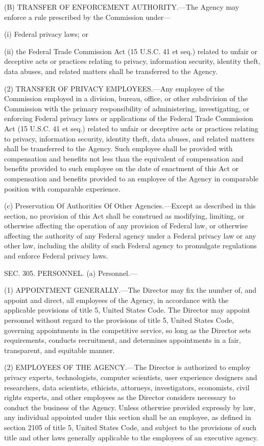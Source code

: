 (B) TRANSFER OF ENFORCEMENT AUTHORITY.—The Agency may enforce a rule prescribed by the Commission under—

(i) Federal privacy laws; or

(ii) the Federal Trade Commission Act (15 U.S.C. 41 et seq.) related to unfair or deceptive acts or practices relating to privacy, information security, identity theft, data abuses, and related matters shall be transferred to the Agency.

(2) TRANSFER OF PRIVACY EMPLOYEES.—Any employee of the Commission employed in a division, bureau, office, or other subdivision of the Commission with the primary responsibility of administering, investigating, or enforcing Federal privacy laws or applications of the Federal Trade Commission Act (15 U.S.C. 41 et seq.) related to unfair or deceptive acts or practices relating to privacy, information security, identity theft, data abuses, and related matters shall be transferred to the Agency. Such employee shall be provided with compensation and benefits not less than the equivalent of compensation and benefits provided to such employee on the date of enactment of this Act or compensation and benefits provided to an employee of the Agency in comparable position with comparable experience.

(c) Preservation Of Authorities Of Other Agencies.—Except as described in this section, no provision of this Act shall be construed as modifying, limiting, or otherwise affecting the operation of any provision of Federal law, or otherwise affecting the authority of any Federal agency under a Federal privacy law or any other law, including the ability of such Federal agency to promulgate regulations and enforce Federal privacy laws.


SEC. 305. PERSONNEL.
(a) Personnel.—

(1) APPOINTMENT GENERALLY.—The Director may fix the number of, and appoint and direct, all employees of the Agency, in accordance with the applicable provisions of title 5, United States Code. The Director may appoint personnel without regard to the provisions of title 5, United States Code, governing appointments in the competitive service, so long as the Director sets requirements, conducts recruitment, and determines appointments in a fair, transparent, and equitable manner.

(2) EMPLOYEES OF THE AGENCY.—The Director is authorized to employ privacy experts, technologists, computer scientists, user experience designers and researchers, data scientists, ethicists, attorneys, investigators, economists, civil rights experts, and other employees as the Director considers necessary to conduct the business of the Agency. Unless otherwise provided expressly by law, any individual appointed under this section shall be an employee, as defined in section 2105 of title 5, United States Code, and subject to the provisions of such title and other laws generally applicable to the employees of an executive agency.

